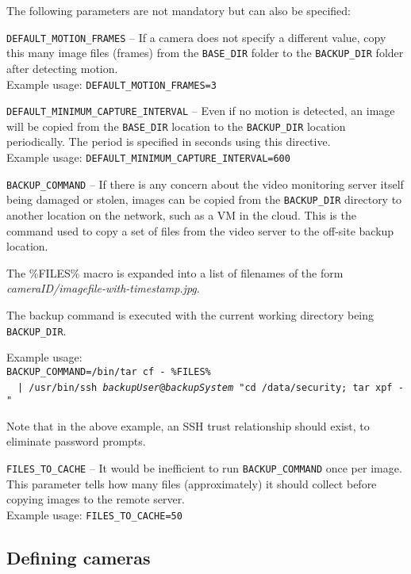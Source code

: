     The following parameters are not mandatory but can also be specified:

    \BI
    \I \texttt{DEFAULT\_MOTION\_FRAMES} -- If a camera does not specify
       a different value, copy this many image files (frames) from
       the \texttt{BASE\_DIR} folder to the \texttt{BACKUP\_DIR}
       folder after detecting motion.\\
       Example usage: \texttt{DEFAULT\_MOTION\_FRAMES=3}

    \I \texttt{DEFAULT\_MINIMUM\_CAPTURE\_INTERVAL} -- Even if no motion is
       detected, an image will be copied from the \texttt{BASE\_DIR} location
       to the \texttt{BACKUP\_DIR} location periodically.  The period is
       specified in seconds using this directive.\\
       Example usage: \texttt{DEFAULT\_MINIMUM\_CAPTURE\_INTERVAL=600}

    \I \texttt{BACKUP\_COMMAND} -- If there is any concern about the
       video monitoring server itself being damaged or stolen, images
       can be copied from the \texttt{BACKUP\_DIR} directory to another
       location on the network, such as a VM in the cloud.  This is
       the command used to copy a set of files from the video server
       to the off-site backup location.

       The \%FILES\% macro is expanded
       into a list of filenames of the form \emph{cameraID/imagefile-with-timestamp.jpg}.

       The backup command is executed with the current working directory
       being \texttt{BACKUP\_DIR}.

       Example usage:\\
       \texttt{BACKUP\_COMMAND=/bin/tar cf - \%FILES\%} \BS{}\\
       \mbox{}~~\texttt{| /usr/bin/ssh \emph{backupUser}@\emph{backupSystem} "cd /data/security; tar xpf -"}

       Note that in the above example, an SSH trust relationship should exist, to
       eliminate password prompts.

    \I \texttt{FILES\_TO\_CACHE} -- It would be inefficient to run
       \texttt{BACKUP\_COMMAND} once per image.  This parameter tells
       \PRODUCT{} how many files (approximately) it should collect before
       copying images to the remote server.\\
       Example usage: \texttt{FILES\_TO\_CACHE=50}
    \EI

  \subsection{Defining cameras}

